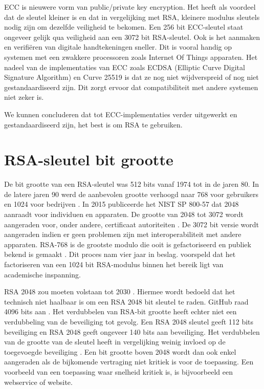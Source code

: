 ECC is nieuwere vorm van public/private key encryption. Het heeft als voordeel
dat de sleutel kleiner is en dat in vergelijking met RSA, kleinere modulus
sleutels nodig zijn om dezelfde veiligheid te bekomen. Een 256 bit ECC-sleutel
staat ongeveer gelijk qua veiligheid aan een 3072 bit RSA-sleutel. Ook is het
aanmaken en verifiëren van digitale handtekeningen sneller.
\autocite{HighSpeedHighSecuritySignatures} Dit is vooral handig op systemen met
een zwakkere processoren zoals Internet Of Things apparaten. Het nadeel van de
implementaties van ECC zoals ECDSA (Elliptic Curve Digital Signature Algorithm)
en Curve 25519 is dat ze nog niet wijdverspreid of nog niet gestandaardiseerd
zijn. Dit zorgt ervoor dat compatibiliteit met andere systemen niet zeker is.

We kunnen concluderen dat tot ECC-implementaties verder uitgewerkt en
gestandaardiseerd zijn, het best is om RSA te gebruiken.

\section{RSA-sleutel bit grootte}
\label{sec:rsa-sleutel-bit-grootte}

De bit grootte van een RSA-sleutel was 512 bits vanaf 1974 tot in de jaren 80.
In de latere jaren 90 werd de aanbevolen grootte verhoogd naar 768 voor
gebruikers en 1024 voor bedrijven \autocite{OriginalRSAKeySizeRecommendations}.
In 2015 publiceerde het \acrshort{NIST} SP 800-57 dat 2048 aanraadt voor
individuen en
apparaten. De grootte van 2048 tot 3072 wordt aangeraden voor, onder andere,
certificaat autoriteiten
\autocite{NISTKeyManagementRecommendationApplicationSpecific}. De 3072 bit
versie wordt aangeraden indien er geen problemen zijn met interoperabiliteit met
andere apparaten. RSA-768 is de grootste modulo die ooit is gefactoriseerd en
publiek bekend is gemaakt \autocite{FactorizationOf768BitRSA}. Dit proces nam
vier jaar in beslag. \textcite{FactorizationOf768BitRSA} voorspeld dat het
factoriseren van een 1024 bit RSA-modulus binnen het bereik ligt van academische
inspanning.

RSA 2048 zou moeten volstaan tot 2030
\autocite{NISTKeyManagementRecommendationGeneral, NISTAlgorithmesAndKeyLengths}.
Hiermee wordt bedoeld dat het technisch niet haalbaar is om een RSA 2048 bit
sleutel te raden. GitHub raad 4096 bits aan
\autocite{GithubGeneratingANewGPGKey}. Het verdubbelen van RSA-bit grootte heeft
echter niet een verdubbeling van de beveiliging tot gevolg. Een RSA 2048 sleutel
geeft 112 bits beveiliging en RSA 2048 geeft ongeveer 140 bits aan beveiliging.
Het verdubbelen van de grootte van de sleutel heeft in vergelijking weinig
invloed op de toegevoegde beveiliging \autocite{GnuPGFAQ}. Een bit grootte boven
2048 wordt dan ook enkel aangeraden als de bijkomende vertraging niet kritiek is
voor de toepassing. Een voorbeeld van een toepassing waar snelheid kritiek is,
is bijvoorbeeld een webservice of website.

